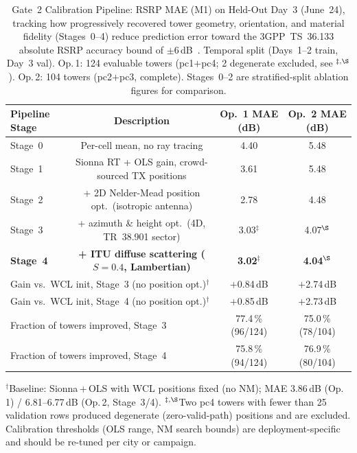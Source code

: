 \documentclass[conference]{IEEEtran}
\begin{document}
\begin{table}[!t]
  \centering
  \caption{Gate~2 Calibration Pipeline: RSRP MAE (M1) on Held-Out Day~3 (June~24),
           tracking how progressively recovered tower geometry, orientation,
           and material fidelity (Stages~0--4) reduce prediction error toward
           the 3GPP~TS~36.133 absolute RSRP accuracy bound of $\pm$6\,dB~\cite{3gpp36133}.
           Temporal split (Days~1--2 train, Day~3 val).
           Op.\,1: 124 evaluable towers (pc1$+$pc4; 2 degenerate excluded, see $^{\ddagger,\S}$). Op.\,2: 104 towers (pc2$+$pc3, complete).
           Stages~0--2 are stratified-split ablation figures for comparison.}
  \label{tab:gate2}
  \renewcommand{\arraystretch}{1.1}
  \begin{tabular}{lccc}
    \toprule
    Pipeline Stage & Description & Op.~1 MAE (dB) & Op.~2 MAE (dB) \\
    \midrule
    Stage~0 & Per-cell mean, no ray tracing                          & 4.40 & 5.48  \\
    Stage~1 & Sionna RT + OLS gain, crowd-sourced TX positions       & 3.61 & 5.48  \\
    Stage~2 & + 2D Nelder-Mead position opt.\ (isotropic antenna)   & 2.78 & 4.48  \\
    Stage~3 & + azimuth \& height opt.\ (4D, TR~38.901 sector)
      & 3.03$^{\ddagger}$ & 4.07$^{\S}$ \\
    \textbf{Stage~4} & \textbf{+ ITU diffuse scattering ($S=0.4$, Lambertian)}
      & \textbf{3.02}$^{\ddagger}$ & \textbf{4.04}$^{\S}$ \\
    \midrule
    \multicolumn{2}{l}{Gain vs.\ WCL init, Stage~3 (no position opt.)$^{\dagger}$}
      & $+$0.84\,dB & $+$2.74\,dB \\
    \multicolumn{2}{l}{Gain vs.\ WCL init, Stage~4 (no position opt.)$^{\dagger}$}
      & $+$0.85\,dB & $+$2.73\,dB \\
    \multicolumn{2}{l}{Fraction of towers improved, Stage~3}
      & 77.4\,\% (96/124) & 75.0\,\% (78/104) \\
    \multicolumn{2}{l}{Fraction of towers improved, Stage~4}
      & 75.8\,\% (94/124) & 76.9\,\% (80/104) \\
    \bottomrule
  \end{tabular}
  \vspace{1mm}
  {\footnotesize $^{\dagger}$Baseline: Sionna\,+\,OLS with WCL positions
  fixed (no NM); MAE 3.86\,dB (Op.\,1) / 6.81--6.77\,dB (Op.\,2, Stage~3/4).
  $^{\ddagger,\S}$Two pc4 towers with fewer than 25 validation rows
  produced degenerate (zero-valid-path) positions and are excluded.
  Calibration thresholds (OLS range, NM search bounds) are
  deployment-specific and should be re-tuned per city or campaign.}
  \vspace{-2mm}
\end{table}
\end{document}
